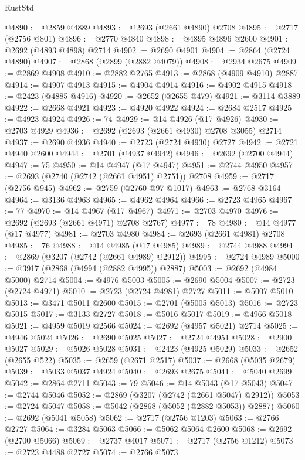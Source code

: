 \begin{lexlean}{RustStd}
\begin{coremodule}
{\begin{coremodule}
{{{{{{{{{{{{{{{{{{{{{{{{{{{{{{{{{{{{{{{@4890 := @2859 @4889
@4893 := @2693 (@2661 @4890) @2708
@4895 := @2717 (@2756 @801)
@4896 := @2770 @4840
@4898 := @4895 @4896 @2600
@4901 := @2692 (@4893 @4898) @2714
@4902 := @2690 @4901
@4904 := @2864 (@2724 @4890)
@4907 := @2868 (@2899 (@2882 @4079))
@4908 := @2934 @2675
@4909 := @2869 @4908
@4910 := @2882 @2765
@4913 := @2868 (@4909 @4910) @2887
@4914 := @4907 @4913
@4915 := @4904 @4914
@4916 := @4902 @4915
@4918 := @2423 (@4885 @4916)
@4920 := @2652 (@2655 @479)
@4921 := @3114 @3889
@4922 := @2668 @4921
@4923 := @4920 @4922
@4924 := @2684 @2517
@4925 := @4923 @4924
@4926 := 74
@4929 := @14 @4926 (@17 @4926)
@4930 := @2703 @4929
@4936 := @2692 (@2693 (@2661 @4930) @2708 @3055) @2714
@4937 := @2690 @4936
@4940 := @2723 (@2724 @4930) @2727
@4942 := @2721 @4940 @2600
@4944 := @2701 (@4937 @4942)
@4946 := @2692 (@2700 @4944)
@4947 := 75
@4950 := @14 @4947 (@17 @4947)
@4951 := @2744 @4950
@4957 := @2693 (@2740 (@2742 (@2661 @4951) @2751)) @2708
@4959 := @2717 (@2756 @945)
@4962 := @2759 (@2760 @97 @1017)
@4963 := @2768 @3164
@4964 := @3136 @4963
@4965 := @4962 @4964
@4966 := @2723 @4965
@4967 := 77
@4970 := @14 @4967 (@17 @4967)
@4971 := @2703 @4970
@4976 := @2692 (@2693 (@2661 @4971) @2708 @2767)
@4977 := 78
@4980 := @14 @4977 (@17 @4977)
@4981 := @2703 @4980
@4984 := @2693 (@2661 @4981) @2708
@4985 := 76
@4988 := @14 @4985 (@17 @4985)
@4989 := @2744 @4988
@4994 := @2869 (@3207 (@2742 (@2661 @4989) @2912))
@4995 := @2724 @4989
@5000 := @3917 (@2868 (@4994 (@2882 @4995)) @2887)
@5003 := @2692 (@4984 @5000) @2714
@5004 := @4976 @5003
@5005 := @2690 @5004
@5007 := @2723 (@2724 @4971)
@5010 := @2723 (@2724 @4981) @2727
@5011 := @5007 @5010
@5013 := @3471 @5011 @2600
@5015 := @2701 (@5005 @5013)
@5016 := @2723 @5015
@5017 := @3133 @2727
@5018 := @5016 @5017
@5019 := @4966 @5018
@5021 := @4959 @5019 @2566
@5024 := @2692 (@4957 @5021) @2714
@5025 := @4946 @5024
@5026 := @2690 @5025
@5027 := @2724 @4951
@5028 := @2900 @5027
@5029 := @5026 @5028
@5031 := @2423 (@4925 @5029)
@5033 := @2652 (@2655 @522)
@5035 := @2659 (@2671 @2517)
@5037 := @2668 (@5035 @2679)
@5039 := @5033 @5037 @4924
@5040 := @2693 @2675
@5041 := @5040 @2699
@5042 := @2864 @2711
@5043 := 79
@5046 := @14 @5043 (@17 @5043)
@5047 := @2744 @5046
@5052 := @2869 (@3207 (@2742 (@2661 @5047) @2912))
@5053 := @2724 @5047
@5058 := @5042 (@2868 (@5052 (@2882 @5053)) @2887)
@5060 := @2692 (@5041 @5058)
@5062 := @2717 (@2756 @1203)
@5063 := @2766 @2727
@5064 := @3284 @5063
@5066 := @5062 @5064 @2600
@5068 := @2692 (@2700 @5066)
@5069 := @2737 @4017
@5071 := @2717 (@2756 @1212)
@5073 := @2723 @4488 @2727
@5074 := @2766 @5073
}}}}}}}}}}}}}}}}}}}}}}}}}}}}}}}}}}}}}}}
\end{coremodule}}
\end{coremodule}
\end{lexlean}
